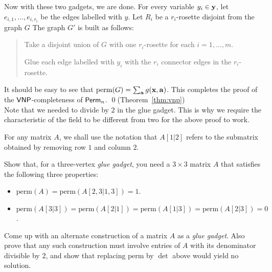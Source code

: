 Now with these two gadgets, we are done. For every variable $y_i \in \mathbf{y}$, let $e_{i,1}, \dots, e_{i,r_i}$ be the edges labelled with $y$. Let $R_i$ be a $r_i$-rosette disjoint from the graph $G$ The graph $G'$ is built as follows:
\begin{quote}
  Take a disjoint union of $G$ with one $r_i$-rosette for each $i = 1,\dots, m$. 

  Glue each edge labelled with $y_i$ with the $r_i$ connector edges in the $r_i$-rosette. 
\end{quote}

It should be easy to see that $\mathrm{perm}(G) = \sum_{\mathbf{a}} g(\mathbf{x}, \mathbf{a})$. This completes the proof of the $\mathsf{VNP}$-completeness of $\mathsf{Perm}_n$. \qed {\footnotesize (Theorem~\ref{thm:vnp})} \\

Note that we needed to divide by $2$ in the glue gadget. This is why we require the characteristic of the field to be different from two for the above proof to work. 

\begin{exercise}
  For any matrix $A$, we shall use the notation that $A[1|2]$ refers to the submatrix obtained by removing row $1$ and column $2$.

  Show that, for a three-vertex \emph{glue gadget}, you need a $3\times 3$ matrix $A$ that satisfies the following three properties:
  \begin{itemize}
    \item $\mathrm{perm}(A) = \mathrm{perm}(A[2,3|1,3]) = 1$. 
    \item $\mathrm{perm}(A[3|3]) = \mathrm{perm}(A[2|1]) = \mathrm{perm}(A[1|3]) = \mathrm{perm}(A[2|3]) = 0$.
  \end{itemize}
  
  Come up with an alternate construction of a matrix $A$ as a \emph{glue gadget}. Also prove that any such construction must involve entries of $A$ with its denominator divisible by $2$, and show that replacing $\mathrm{perm}$ by $\det$ above would yield no solution. 
\end{exercise}



